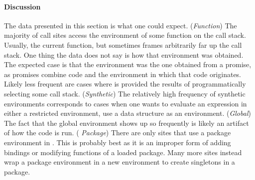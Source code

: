 \documentclass[review,screen,acmsmall,anonymous=true]{acmart}
\begin{document}
\paragraph{Discussion}
The data presented in this section is what one could expect. ({\it Function})
The majority of \eval call sites access the environment of some function on the
call stack. Usually, the current function, but sometimes frames arbitrarily far
up the call stack. One thing the data does not say is how that environment was
obtained. The expected case is that the environment was the one obtained from a
promise, as promises combine code and the environment in which that code
originates. Likely less frequent are cases where \eval is provided the results
of programmatically selecting some call stack. ({\it Synthetic}) The relatively
high frequency of synthetic environments corresponds to cases when one wants to
evaluate an expression in either a restricted environment, use a data
structure as an environment. ({\it Global}) The fact that the global environment
shows up so frequently is likely an artifact of how the code is run. ({\it
  Package}) There are only \packageNbPackageNamespaceEnvSites sites that use a %
 package environment in \eval. This is probably best as it is an improper form of adding bindings or modifying functions of a loaded package. Many more sites instead wrap a package environment in a new
environment to create singletons in a package.


\end{document}
